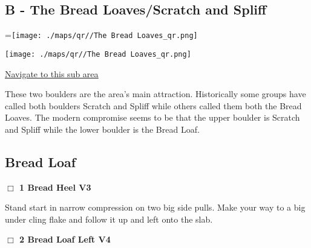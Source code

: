 	\begin{multicols}{2}

\section{B - The Bread Loaves/Scratch and Spliff}\label{sa:The Bread Loaves}
=\hbox{\texttt{[image: ./maps/qr//The Bread Loaves\_qr.png]}}%
\begin{center}
\texttt{[image: ./maps/qr//The Bread Loaves\_qr.png]}
\end{center}
\begin{center}
\underline{\textcolor{blue}{\href{http://maps.google.com/maps?q=44.43968787057463,-122.58169628966748}{Navigate to this sub area}}}
\end{center}


These two boulders are the area's main attraction. Historically some groups have called both boulders Scratch and Spliff while others called them both the Bread Loaves. The modern compromise seems to be that the upper boulder is Scratch and Spliff while the lower boulder is the Bread Loaf.\\




\needspace{10em}
\subsection*{Bread Loaf}\label{bf:Bread Loaf}




\needspace{2em}
\label{rt:Bread Heel}
\colorbox{green!20}{
\parbox{0.95\linewidth}{
\hspace{-1ex}\textbf{$\Box$
1 Bread Heel V3  
}}}
\begin{adjustwidth}{1.3em}{}			

Stand start in narrow compression on two big side pulls. Make your way to a big under cling flake and follow it up and left onto the slab.
\end{adjustwidth}




\needspace{2em}
\label{rt:Bread Loaf Left}
\colorbox{RoyalBlue!20}{
\parbox{0.95\linewidth}{
\hspace{-1ex}\textbf{$\Box$
2 Bread Loaf Left V4  
}}}
\begin{adjustwidth}{1.3em}{}			


\end{adjustwidth}
\end{multicols}
